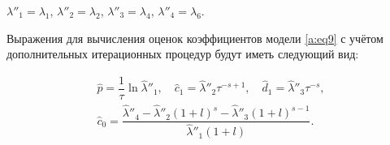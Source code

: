 $\lambda''_1= \lambda_1$, $\lambda''_2= \lambda_2$, $\lambda''_3= \lambda_4$, $\lambda''_4= \lambda_6$.




Выражения для вычисления оценок коэффициентов модели \eqref{a:eq9} с учётом дополнительных итерационных процедур будут иметь следующий вид:


 \begin{equation}   \label{a:eq17}

 \begin{array}{c}

\hat{p}=\dfrac{1}{\tau}\ln{\hat{\lambda}''}_1,\quad 

\hat{c}_1={\hat{\lambda}''}_2 \tau^{-s+1},\quad 

\hat{d}_1={\hat{\lambda}''}_3 \tau^{-s},\\

\hat{c}_0=

\dfrac

{{\hat{\lambda}''}_4-{\hat{\lambda}''}_2 (1 + l)^s

- {{\hat{\lambda}''}_3} (1 + l)^{s - 1}}

{{{\hat{\lambda}''}_1}{(1 +

l)}}.

\end{array}

\end{equation}







